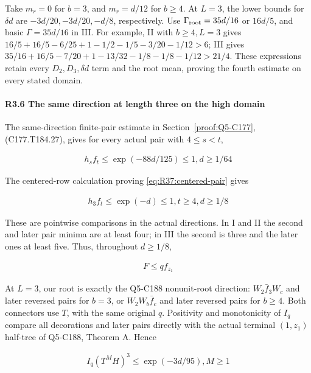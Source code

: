 Take \(m_r=0\) for \(b=3\), and \(m_r=d/12\) for \(b\ge4\). At \(L=3\), the lower bounds for \(\delta d\) are \(-3d/20,\allowbreak \allowbreak -3d/20,\allowbreak \allowbreak -d/8\), respectively. Use \(\Gamma_{\rm root}=35d/16\) or \(16d/5\), and basic \(\Gamma=35d/16\) in III. For example, II with \(b\ge4,\allowbreak \allowbreak  L=3\) gives \(16/5+16/5-6/25+1-1/2-1/5-3/20-1/12>6\); III gives \(35/16+16/5-7/20+1-13/32-1/8-1/8-1/12>21/4\). These expressions retain every \(D_2,\allowbreak \allowbreak  D_3,\allowbreak \allowbreak  \delta d\) term and the root mean, proving the fourth estimate on every stated domain.

\paragraph{R3.6 The same direction at length three on the high domain}

The same-direction finite-pair estimate in
Section~\ref{proof:Q5-C177}, \textup{(C177.T184.27)}, gives
for every actual pair with \(4\le s<t\),

\[
\begin{gathered}
h_s f_t\le \exp(-88d/125)\le 1,d\ge 1/64 
\end{gathered}\tag{R3.6.1}
\]

The centered-row calculation proving \eqref{eq:R37:centered-pair} gives

\[
\begin{gathered}
h_3 f_t\le \exp(-d)\le 1,t\ge 4,d\ge 1/8 
\end{gathered}\tag{R3.6.2}
\]

These are pointwise comparisons in the actual directions. In I and II the second and later pair minima are at least four; in III the second is three and the later ones at least five. Thus, throughout \(d\ge1/8\),

\[
\begin{gathered}
F\le q f_{z_1} 
\end{gathered}\tag{R3.6.3}
\]

At \(L=3\), our root is exactly the Q5-C188 nonunit-root direction: \(W_2\bar f_3W_c\) and later reversed pairs for \(b=3\), or \(W_2W_b\bar f_c\) and later reversed pairs for \(b\ge4\). Both connectors use \(T\), with the same original \(q\). Positivity and monotonicity of \(I_q\) compare all decorations and later pairs directly with the actual terminal \((1,\allowbreak \allowbreak  z_1)\) half-tree of Q5-C188, Theorem A. Hence

\[
\begin{gathered}
I_q(T^M H)^3\le \exp(-3d/95),M\ge 1 
\end{gathered}\tag{R3.6.4}
\]



